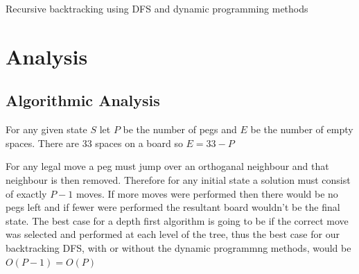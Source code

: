 \documentclass[12pt,a4paper]{report}
\begin{document}
\begin{algorithm}[H]
	\DontPrintSemicolon
  \label{dyn-alg}
	\caption{Recursive backtracking using DFS and dynamic programming methods}
\end{algorithm}

\section*{Analysis}
\subsection*{Algorithmic Analysis}\label{algo-analysis}
For any given state $S$ let $P$ be the number of pegs and $E$ be the number of empty spaces.
There are 33 spaces on a board so $E=33-P$

For any legal move a peg must jump over an orthoganal neighbour and that neighbour is then removed. Therefore for any initial state a solution must consist of exactly $P-1$ moves. If more moves were performed then there would be no pegs left and if fewer were performed the resultant board wouldn't be the final state.
The best case for a depth first algorithm is going to be if the correct move was selected and performed at each level of the tree, thus the best case for our backtracking DFS, with or without the dynamic programmng methods,  would be $O(P-1)=O(P)$
\end{document}

